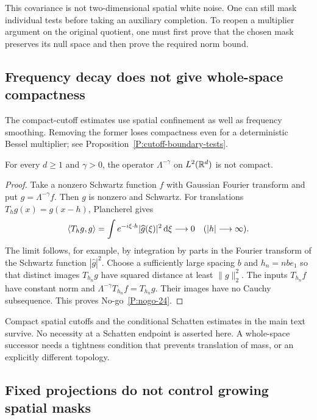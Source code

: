 This covariance is not two-dimensional spatial white noise. One can still
mask individual tests before taking an auxiliary completion. To reopen a
multiplier argument on the original quotient, one must first prove that the
chosen mask preserves its null space and then prove the required norm bound.

\subsection{Frequency decay does not give whole-space compactness}
\label{S:nogo-24}

The compact-cutoff estimates use spatial confinement as well as frequency
smoothing. Removing the former loses compactness even for a deterministic
Bessel multiplier; see Proposition~\ref{P:cutoff-boundary-tests}.

\setcounter{nogo}{23}
\begin{nogo}
  \label{P:nogo-24}
  For every $d\ge1$ and $\gamma>0$, the operator $\Lambda^{-\gamma}$ on
  $L^2(\mathbb{R}^d)$ is not compact.
\end{nogo}
\begin{proof}
  Take a nonzero Schwartz function $f$ with Gaussian Fourier transform and put
  $g=\Lambda^{-\gamma}f$. Then $g$ is nonzero and Schwartz. For translations
  $T_hg(x)=g(x-h)$, Plancherel gives
  \[
    \langle T_hg,g\rangle
    =\int e^{-i\xi\cdot h}|\widehat g(\xi)|^2\,\mathrm{d}\xi\longrightarrow0
    \quad (|h|\longrightarrow\infty).
  \]
  The limit follows, for example, by integration by parts in the Fourier
  transform of the Schwartz function $|\widehat g|^2$.
  Choose a sufficiently large spacing $b$ and $h_n=nb e_1$ so that distinct
  images $T_{h_n}g$ have squared distance at least $\|g\|_2^2$.
  The inputs $T_{h_n}f$ have constant norm and
  $\Lambda^{-\gamma}T_{h_n}f=T_{h_n}g$. Their images have no Cauchy
  subsequence. This proves No-go~\ref{P:nogo-24}.
\end{proof}

Compact spatial cutoffs and the conditional Schatten estimates in the main
text survive. No necessity at a Schatten endpoint is asserted here. A
whole-space successor needs a tightness condition that prevents translation
of mass, or an explicitly different topology.

\subsection{Fixed projections do not control growing spatial masks}
\label{S:nogo-25}

